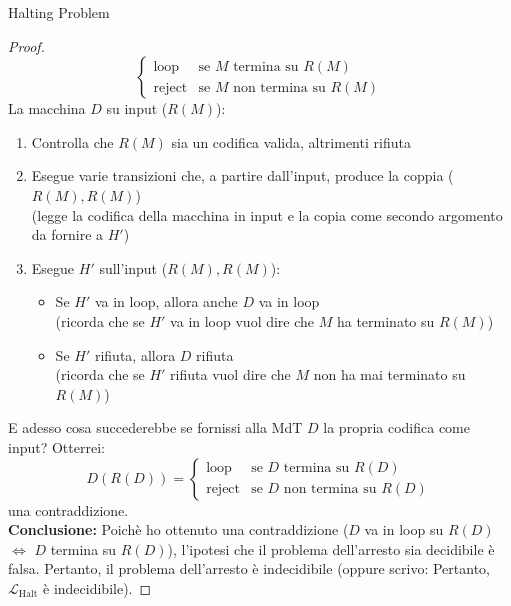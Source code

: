 \documentclass{article}  %
\theoremstyle{definition}
\begin{document}
\begin{theorem}{Halting Problem}
\begin{proof}
\[			\begin{cases}
				\text{loop}   & \text{se } M \text{ termina su } R(M)      \\
				\text{reject} & \text{se } M \text{  non termina su } R(M)
			\end{cases}
		\]
		La macchina $D$ su input ($R(M)$):
		\begin{enumerate}
			\item Controlla che $R(M)$ sia un codifica valida, altrimenti rifiuta
			\item Esegue varie transizioni che, a partire dall'input, produce la coppia ($R(M),R(M)$) \\
			      (legge la codifica della macchina in input e la copia come secondo argomento da fornire a $H'$)
			\item Esegue $H'$ sull'input ($R(M),R(M)$):
			      \begin{itemize}
				      \item Se $H'$ va in loop, allora anche $D$ va in loop \\
				            (ricorda che se $H'$ va in loop vuol dire che $M$ ha terminato su $R(M)$)
				      \item Se $H'$ rifiuta, allora $D$ rifiuta \\
				            (ricorda che se $H'$ rifiuta vuol dire che $M$ non ha mai terminato su $R(M)$)
			      \end{itemize}
		\end{enumerate}
		E adesso cosa succederebbe se fornissi alla MdT $D$ la propria codifica come input? Otterrei:
		\[
			D(R(D)) =
			\begin{cases}
				\text{loop}   & \text{se } D \text{ termina su } R(D)      \\
				\text{reject} & \text{se } D \text{  non termina su } R(D)
			\end{cases}
		\]
		una contraddizione. \\
		\textbf{Conclusione:} Poichè ho ottenuto una contraddizione ($D$ va in loop su $R(D)$ $\iff$ $D$ termina su $R(D)$), l'ipotesi
		che il problema dell'arresto sia decidibile è falsa. Pertanto, il problema dell'arresto è indecidibile (oppure scrivo:
		Pertanto, $\mathcal{L}_{\text{Halt}}$ è indecidibile).
	\end{proof}
\end{theorem}
\end{document}

